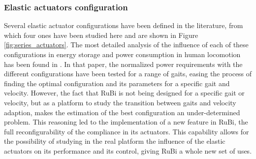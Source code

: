\subsubsection{Elastic actuators configuration} %
\label{ssub:elastic_actuator_configuration}
Several elastic actuator configurations have been defined in the literature, from which four ones have been studied here and are shown in Figure \ref{fig:series_actuators}.
The most detailed analysis of the influence of each of these configurations in energy storage and power consumption in human locomotion has been found in \cite{grimmer}.
In that paper, the normalized power requirements with the different configurations have been tested for a range of gaits, easing the process of finding the optimal configuration and its parameters for a specific gait and velocity.
However, the fact that RuBi is not being designed for a specific gait or velocity, but as a platform to study the transition between gaits and velocity adaption, makes the estimation of the best configuration an under-determined problem.
This reasoning led to the implementation of a new feature in RuBi, the full reconfigurability of the compliance in its actuators.
This capability allows for the possibility of studying in the real platform the influence of the elastic actuators on its performance and its control, giving RuBi a whole new set of uses.

